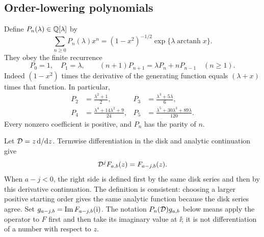\subsection{Order-lowering polynomials}
Define $P_n(\lambda)\in\mathbb Q[\lambda]$ by
\begin{equation}\label{eq:momentPgen}
 \sum_{n\ge0}P_n(\lambda)x^n
 =(1-x^2)^{-1/2}\exp\{\lambda\operatorname{arctanh}x\}.
\end{equation}
They obey the finite recurrence
\begin{equation}\label{eq:momentPrec}
 P_0=1,\quad P_1=\lambda,\qquad
 (n+1)P_{n+1}=\lambda P_n+nP_{n-1}\quad(n\ge1).
\end{equation}
Indeed $(1-x^2)$ times the derivative of the generating function equals $(\lambda+x)$ times that function. In particular,
\begin{align*}
 P_2&=\frac{\lambda^2+1}{2},&
 P_3&=\frac{\lambda^3+5\lambda}{6},\\
 P_4&=\frac{\lambda^4+14\lambda^2+9}{24},&
 P_5&=\frac{\lambda^5+30\lambda^3+89\lambda}{120}.
\end{align*}
Every nonzero coefficient is positive, and $P_n$ has the parity of $n$.

Let $\mathcal D=z\,\mathrm d/\mathrm dz$. Termwise differentiation in the disk and analytic continuation give
\begin{equation}\label{eq:lowering}
 \mathcal D^j F_{a,b}(z)=F_{a-j,b}(z).
\end{equation}
When $a-j<0$, the right side is defined first by the same disk series and then by this derivative continuation. The definition is consistent: choosing a larger positive starting order gives the same analytic function because the disk series agree. Set $g_{a-j,b}=\operatorname{Im} F_{a-j,b}(\mathrm i)$. The notation $P_n(\mathcal D)g_{a,b}$ below means apply the operator to $F$ first and then take its imaginary value at $\ii$; it is not differentiation of a number with respect to $z$.

